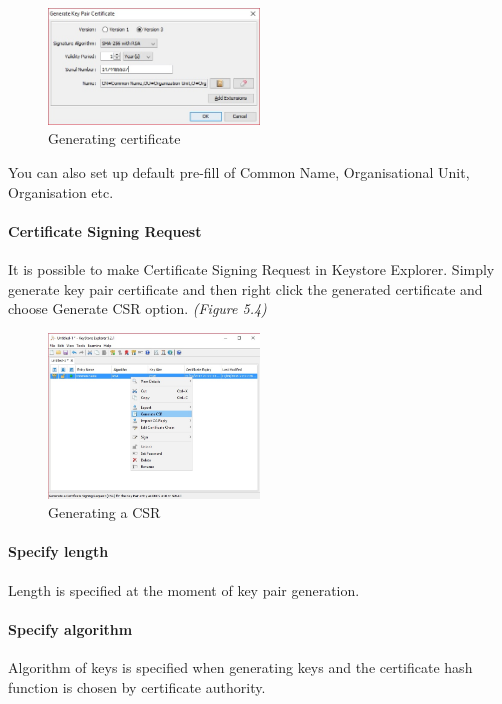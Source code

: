 \documentclass[10pt, a4paper]{report}
\begin{document}
\begin{figure}[!htbp]
 \caption{Generating certificate}
 \centering
  \includegraphics[width=0.5\textwidth]{../Dependancies/Keystore_Explorer/genCert.jpg}
\end{figure}

You can also set up default pre-fill of Common Name, Organisational Unit, Organisation etc.

      \paragraph{Certificate Signing Request}
It is possible to make Certificate Signing Request in Keystore Explorer. Simply generate key pair certificate and then right click the generated certificate and choose Generate CSR option. \textit{(Figure 5.4)}

\begin{figure}[!htbp]
 \caption{Generating a CSR}
 \centering
  \includegraphics[width=0.5\textwidth]{../Dependancies/Keystore_Explorer/genCSR.jpg}
\end{figure}

      \paragraph{Specify length}
Length is specified at the moment of key pair generation.

      \paragraph{Specify algorithm}
Algorithm of keys is specified when generating keys and the certificate hash function is chosen by certificate authority.
\end{document}
